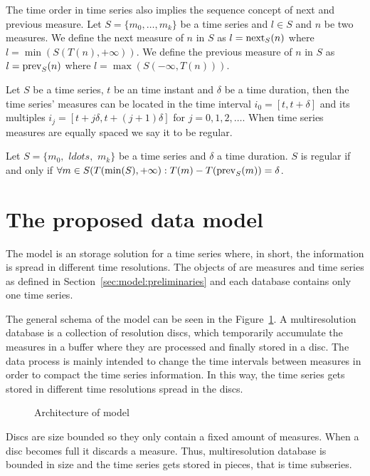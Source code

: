 The time order in time series also implies the sequence concept of
next and previous measure.  Let $S=\{m_0, \ldots, m_k\}$ be a time
series and $l\in S$ and $n$ be two measures. We define the next
measure of $n$ in $S$ as $l=\operatorname*{next}_S(n)$ where $l =
\min(S(T(n),+\infty))$. We define the previous measure of $n$ in $S$
as $l=\operatorname*{prev}_S(n)$ where $l = \max(S(-\infty,T(n)))$.

Let $S$ be a time series, $t$ be an time instant and $\delta$ be a
time duration, then the time series' measures can be located in the
time interval $i_0=[t, t+\delta]$ and its multiples $i_j=[t+j\delta,
t+(j+1)\delta]$ for $j=0,1,2,\ldots$. When time series measures are
equally spaced we say it to be regular.
\begin{definition}
  Let $S=\{m_0,$ $ldots,$ $m_k\}$ be a time series and $\delta$ a time
  duration. $S$ is regular if and only if $\forall m \in
  S(T(\min(S),+\infty):T(m) - T(\operatorname*{prev}_S(m)) = \delta$.
\end{definition}

\section{The proposed data model}
\label{sec:MTSMS}

The  model is an storage solution for a time series where,
in short, the information is spread in different time resolutions.
The objects of  are measures and time series as defined in
Section~\ref{sec:model:preliminaries} and each  database
contains only one time series.

The general schema of the  model can be seen in the
Figure~\ref{fig:model:mtsdb}.  A multiresolution database is a
collection of resolution discs, which temporarily accumulate the
measures in a buffer where they are processed and finally stored in a
disc. The data process is mainly intended to change the time intervals
between measures in order to compact the time series information. In
this way, the time series gets stored in different time resolutions
spread in the discs.

\begin{figure}[tp]
  \centering
  
  \smallskip
  \caption{Architecture of  model}
  \label{fig:model:mtsdb}
\end{figure}

Discs are size bounded so they only contain a fixed amount of
measures. When a disc becomes full it discards a measure. Thus,
multiresolution database is bounded in size and the time series gets
stored in pieces, that is time subseries.

